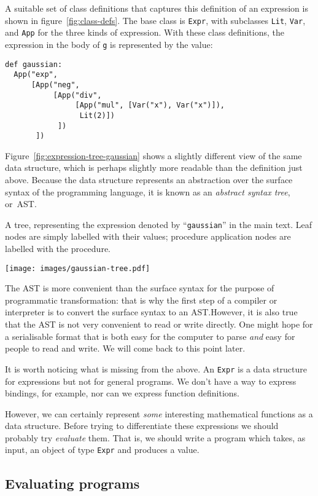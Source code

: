 \documentclass[11pt, a4paper]{article}
\newcommand{\cd}[1]{\texttt{#1}}
\begin{document}
A suitable set of class definitions that captures this definition of
an expression is shown in figure~\ref{fig:class-defs}. The base class
is \cd{Expr}, with subclasses \cd{Lit}, \cd{Var}, and \cd{App} for the
three kinds of expression. With these class definitions, the
expression in the body of \cd{g} is represented by the value:
\begin{verbatim}
def gaussian:
  App("exp",
      [App("neg",
           [App("div",
                [App("mul", [Var("x"), Var("x")]),
                 Lit(2)])
            ])
       ])
\end{verbatim}
Figure~\ref{fig:expression-tree-gaussian} shows a slightly different
view of the same data structure, which is perhaps slightly more
readable than the definition just above. Because the data structure
represents an abstraction over the surface syntax of the programming
language, it is known as an \emph{abstract syntax tree}, or~AST.
 \begin{marginfigure}
  \caption{A tree, representing the expression denoted by
    ``\cd{gaussian}'' in the main text. Leaf nodes are simply
    labelled with their values; procedure application nodes are
    labelled with the procedure.\label{fig:expression-tree-gaussian}}
  \centering
  \texttt{[image: images/gaussian-tree.pdf]}
\end{marginfigure}

The AST is more convenient than the surface syntax for the purpose of
programmatic transformation: that is why the first step of a compiler
or interpreter is to convert the surface syntax to an AST.\@ However,
it is also true that the AST is not very convenient to read or write
directly. One might hope for a serialisable format that is both easy
for the computer to parse \emph{and} easy for people to read and
write. We will come back to this point later.

It is worth noticing what is missing from the above. An \cd{Expr} is a
data structure for expressions but not for general programs. We don't
have a way to express bindings, for example, nor can we express
function definitions.

However, we can certainly represent \emph{some} interesting
mathematical functions as a data structure. Before trying to
differentiate these expressions we should probably try \emph{evaluate}
them. That is, we should write a program which takes, as input, an
object of type \cd{Expr} and produces a value.

\subsection{Evaluating programs}
\end{document}
